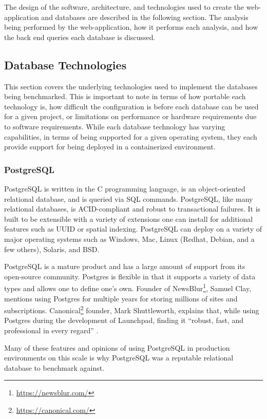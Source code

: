 The design of the software, architecture, and technologies used to create the web-application and databases are described in the following section. The analysis being performed by the web-application, how it performs each analysis, and how the back end queries each database is discussed.

\subsection{Database Technologies}

This section covers the underlying technologies used to implement the databases being benchmarked. This is important to note in terms of how portable each technology is, how difficult the configuration is before each database can be used for a given project, or limitations on performance or hardware requirements due to software requirements. While each database technology has varying capabilities, in terms of being supported for a given operating system, they each provide support for being deployed in a containerized environment.

\subsubsection{PostgreSQL}
PostgreSQL is written in the C programming language, is an object-oriented relational database, and is queried via SQL commands. PostgreSQL, like many relational databases, is ACID-compliant and robust to transactional failures. It is built to be extensible with a variety of extensions one can install for additional features such as UUID or spatial indexing. PostgreSQL can deploy on a variety of major operating systems such as Windows, Mac, Linux (Redhat, Debian, and a few others), Solaris, and BSD.

PostgreSQL is a mature product and has a large amount of support from its open-source community. Postgres is flexible in that it supports a variety of data types and allows one to define one's own. Founder of NewsBlur\footnote{\url{https://newsblur.com/}}, Samuel Clay, mentions using Postgres for multiple years for storing millions of sites and subscriptions. Canonical\footnote{\url{https://canonical.com/}} founder, Mark Shuttleworth, explains that, while using Postgres during the development of Launchpad, finding it ``robust, fast, and professional in every regard'' \cite{postgres-about}.

Many of these features and opinions of using PostgreSQL in production environments on this scale is why PostgreSQL was a reputable relational database to benchmark against.

